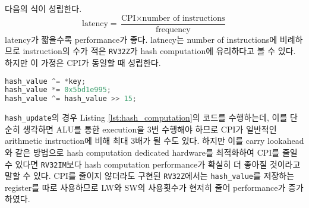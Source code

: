 \documentclass[
    a4paper,
    oneside,
    adjustmath,
    finemath,
    itemph,
    nonfrench,
    11pt
]{oblivoir}
\begin{document}
\begin{enumerate}
        다음의 식이 성립한다.
        \[ \text{latency} = \frac{\text{CPI} \times \text{number of instructions}}{\text{frequency}} \]
        latency가 짧을수록 performance가 좋다.
        latnecy는 number of instructions에 비례하므로 instruction의 수가 적은 \verb|RV32Z|가 hash computation에 유리하다고 볼 수 있다.
        하지만 이 가정은 CPI가 동일할 때 성립한다.

        \begin{lstlisting}[language=C, caption=Hash Computation, label=lst:hash_computation]
hash_value ^= *key;
hash_value *= 0x5bd1e995;
hash_value ^= hash_value >> 15;
        \end{lstlisting}

        \verb|hash_update|의 경우 Listing \ref{lst:hash_computation}의 코드를 수행하는데, 이를 단순히 생각하면 ALU를 통한 execution을 3번 수행해야 하므로 CPI가 일반적인 arithmetic instruction에 비해 최대 3배가 될 수도 있다.
        하지만 이를 carry lookahead와 같은 방법으로 hash computation dedicated hardware를 최적화하여 CPI를 줄일 수 있다면 \verb|RV32IM|보다 hash computation performance가 확실히 더 좋아질 것이라고 말할 수 있다.
        CPI를 줄이지 않더라도 구현된 \verb|RV32Z|에서는 \verb|hash_value|를 저장하는 register를 따로 사용하므로 LW와 SW의 사용횟수가 현저히 줄어 performance가 증가하였다.
    \end{enumerate}
\end{document}
